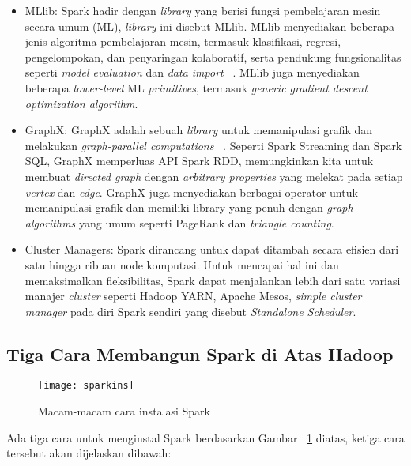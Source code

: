 \begin{itemize}
\item MLlib: Spark hadir dengan \textit{library} yang berisi fungsi pembelajaran mesin secara umum (ML), \textit{library} ini disebut MLlib. MLlib menyediakan beberapa jenis algoritma pembelajaran mesin, termasuk klasifikasi, regresi, pengelompokan, dan penyaringan kolaboratif, serta pendukung
fungsionalitas seperti \textit{model evaluation} dan \textit{data import} ~\cite{holdenkarau:07:ls}. MLlib juga menyediakan
beberapa \textit{lower-level} ML \textit{primitives}, termasuk \textit{generic gradient descent optimization
algorithm}.

\item GraphX: GraphX adalah sebuah \textit{library} untuk memanipulasi grafik dan melakukan \textit{graph-parallel computations} ~\cite{holdenkarau:07:ls}. Seperti Spark Streaming dan Spark SQL, GraphX ​​memperluas API Spark RDD, memungkinkan kita untuk membuat \textit{directed graph} dengan \textit{arbitrary properties} yang melekat pada setiap \textit{vertex} dan \textit{edge}. GraphX ​​juga menyediakan berbagai operator untuk memanipulasi grafik dan memiliki library yang penuh dengan \textit{graph algorithms} yang umum seperti PageRank dan \textit{triangle counting}.

\item Cluster Managers: Spark dirancang untuk dapat ditambah secara efisien dari satu hingga ribuan node komputasi. Untuk mencapai hal ini dan memaksimalkan fleksibilitas, Spark dapat menjalankan lebih dari satu variasi manajer \textit{cluster} seperti Hadoop YARN, Apache Mesos, \textit{simple
cluster manager} pada diri Spark sendiri yang disebut \textit{Standalone Scheduler}.\\

\end{itemize}

\subsection{Tiga Cara Membangun Spark di Atas Hadoop}

\begin{figure}[H]
    \centering  
    \texttt{[image: sparkins]}  
    \caption[Macam-macam cara instalasi Spark]{Macam-macam cara instalasi Spark} 
    \label{fig:sparkins} 
\end{figure}

Ada tiga cara untuk menginstal Spark berdasarkan Gambar ~\ref{fig:sparkins} diatas, ketiga cara tersebut akan dijelaskan dibawah:

